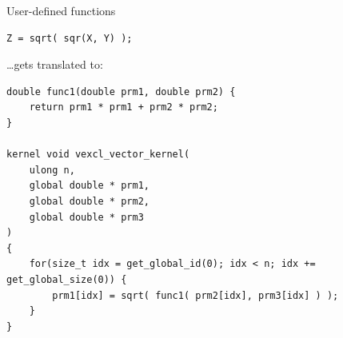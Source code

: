 \documentclass[@BEAMER_OPTIONS@]{beamer}
\begin{document}
\begin{frame}[fragile]{User-defined functions}
    \begin{exampleblock}{}
        \begin{lstlisting}
Z = sqrt( sqr(X, Y) );
        \end{lstlisting}
    \end{exampleblock}
    \begin{exampleblock}{\ldots gets translated to:}
        \begin{lstlisting}
double func1(double prm1, double prm2) {
    return prm1 * prm1 + prm2 * prm2;
}

kernel void vexcl_vector_kernel(
    ulong n,
    global double * prm1,
    global double * prm2,
    global double * prm3
)
{
    for(size_t idx = get_global_id(0); idx < n; idx += get_global_size(0)) {
        prm1[idx] = sqrt( func1( prm2[idx], prm3[idx] ) );
    }
}
        \end{lstlisting}
    \end{exampleblock}
\end{frame}
\end{document}
